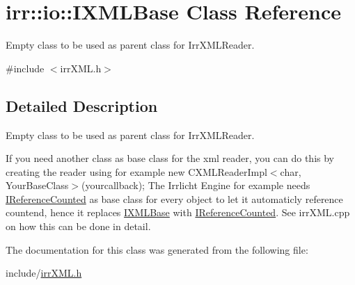 \hypertarget{classirr_1_1io_1_1IXMLBase}{}\section{irr\+:\+:io\+:\+:I\+X\+M\+L\+Base Class Reference}
\label{classirr_1_1io_1_1IXMLBase}


Empty class to be used as parent class for Irr\+X\+M\+L\+Reader.  




{\ttfamily \#include $<$irr\+X\+M\+L.\+h$>$}



\subsection{Detailed Description}
Empty class to be used as parent class for Irr\+X\+M\+L\+Reader. 

If you need another class as base class for the xml reader, you can do this by creating the reader using for example new C\+X\+M\+L\+Reader\+Impl$<$char, Your\+Base\+Class$>$(yourcallback); The Irrlicht Engine for example needs \hyperlink{classirr_1_1IReferenceCounted}{I\+Reference\+Counted} as base class for every object to let it automaticly reference countend, hence it replaces \hyperlink{classirr_1_1io_1_1IXMLBase}{I\+X\+M\+L\+Base} with \hyperlink{classirr_1_1IReferenceCounted}{I\+Reference\+Counted}. See irr\+X\+M\+L.\+cpp on how this can be done in detail. 

The documentation for this class was generated from the following file\+:\begin{DoxyCompactItemize}
\item 
include/\hyperlink{irrXML_8h}{irr\+X\+M\+L.\+h}\end{DoxyCompactItemize}
